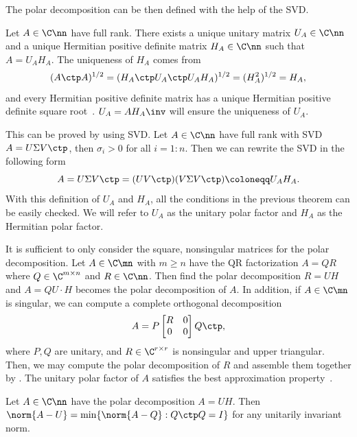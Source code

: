\documentclass{article}
\numberwithin{equation}{section} %
\begin{document}
The polar decomposition can be then defined with the help of the SVD.
\begin{theorem}
Let $A\in\C\nn$ have full rank.
There exists a unique unitary matrix $U_{A}\in\C\nn$
and a unique Hermitian positive definite matrix $H_{A}\in\C\nn$
such that $A = U_{A}H_{A}$. The uniqueness of $H_{A}$ comes from
\begin{equation}\notag
  (A\ctp A)^{1/2} = (H_{A}\ctp U_{A}\ctp U_{A}H_{A})^{1/2} =
  (H_{A}^{2})^{1/2} = H_{A}, 
\end{equation}
and every Hermitian positive definite matrix has a unique Hermitian positive
definite square root~. $U_{A} = A H_{A}\inv$
will ensure the uniqueness of $U_{A}$.
\end{theorem}
This can be proved by using SVD. Let $A\in\C\nn$ have full rank with
SVD $A = U\Sigma V\ctp$, then $\sigma_{i} > 0$ for all $i = 1:n$.
Then we can rewrite the SVD in the following form
\begin{equation}\notag
  A = U\Sigma V\ctp = (UV\ctp) (V\Sigma V\ctp) \coloneqq U_{A} H_{A}.
\end{equation}
With this definition of $U_{A}$ and $H_{A}$, all the conditions in the
previous 
theorem can be easily checked. We will refer to $U_{A}$ as the unitary polar
factor and $H_{A}$ as the Hermitian polar factor. 

It is sufficient to only consider the square, nonsingular matrices for the polar
decomposition. Let $A\in\C\mn$ with $m\geq n$ have 
the QR factorization $A = QR$ where $Q\in\C^{m\times n}$ and $R\in\C\nn$.
Then find the polar decomposition $R = UH$ and $A = QU\cdot H$ becomes the
polar decomposition of $A$. In addition, if $A\in\C\mn$ is singular, we can
compute a complete orthogonal decomposition
\begin{equation}\notag
  A = P
  \begin{bmatrix}
    R & 0 \\ 0 & 0 
  \end{bmatrix}
  Q\ctp,
\end{equation}
where $P,Q$ are unitary, and $R\in\C^{r\times r}$ is nonsingular and upper
triangular. %
Then, we may compute
the polar decomposition of $R$ and assemble them together by 
.
The unitary polar factor of $A$ satisfies the best approximation
property~.
\begin{theorem}
\label{thm.best-approximation}
Let $A\in\C\nn$ have the polar decomposition $A = UH$.
Then $\norm{A - U} = \min \{ \norm{A-Q} : Q\ctp Q = I\}$ for any unitarily
invariant norm. 
\end{theorem}
\end{document}
